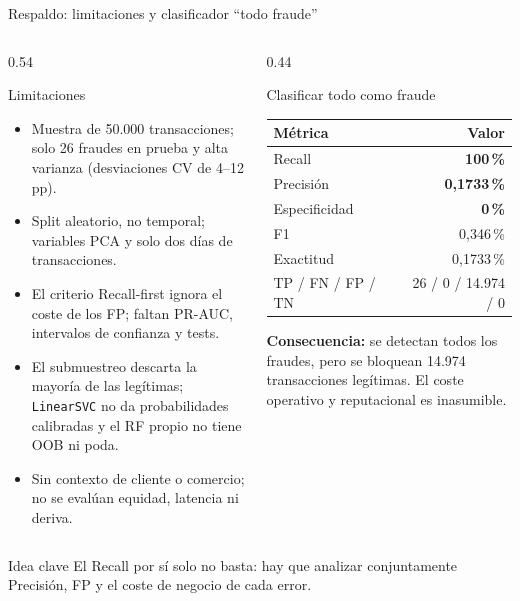 \documentclass[aspectratio=169,11pt]{beamer}
\begin{document}
\begin{frame}{Respaldo: limitaciones y clasificador ``todo fraude''}
  \begin{columns}[T]
    \begin{column}{0.54\textwidth}
      \begin{block}{Limitaciones}
        \scriptsize
        \begin{itemize}
          \item Muestra de 50.000 transacciones; solo 26 fraudes en
                prueba y alta varianza (desviaciones CV de 4--12 pp).
          \item Split aleatorio, no temporal; variables PCA y solo dos
                días de transacciones.
          \item El criterio Recall-first ignora el coste de los FP;
                faltan PR-AUC, intervalos de confianza y tests.
          \item El submuestreo descarta la mayoría de las legítimas;
                \texttt{LinearSVC} no da probabilidades calibradas y el
                RF propio no tiene OOB ni poda.
          \item Sin contexto de cliente o comercio; no se evalúan
                equidad, latencia ni deriva.
        \end{itemize}
      \end{block}
    \end{column}
    \begin{column}{0.44\textwidth}
      \begin{block}{Clasificar todo como fraude}
        \scriptsize
        \begin{tabular}{@{}lr@{}}
          \toprule
          Métrica & Valor \\
          \midrule
          Recall & \textbf{100\,\%} \\
          Precisión & \textbf{0,1733\,\%} \\
          Especificidad & \textbf{0\,\%} \\
          F1 & 0,346\,\% \\
          Exactitud & 0,1733\,\% \\
          TP / FN / FP / TN & 26 / 0 / 14.974 / 0 \\
          \bottomrule
        \end{tabular}
      \end{block}
      \vspace{0.1cm}
      {\scriptsize \textbf{Consecuencia:} se detectan todos los fraudes,
      pero se bloquean 14.974 transacciones legítimas. El coste
      operativo y reputacional es inasumible.}
    \end{column}
  \end{columns}
  \vspace{0.15cm}
  \begin{alertblock}{Idea clave}
    \small
    El Recall por sí solo no basta: hay que analizar conjuntamente
    Precisión, FP y el coste de negocio de cada error.
  \end{alertblock}
\end{frame}
\end{document}
